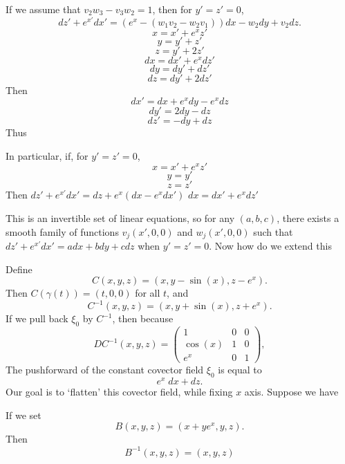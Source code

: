 \documentclass[dvipsnames,letterpaper,12pt]{article}
\begin{document}
%
If we assume that $v_2 w_3 - v_3 w_2 = 1$, then for $y' = z' = 0$,
%
\[ dz' + e^{x'} dx' = (e^x - (w_1 v_2 - w_2 v_1)) dx  - w_2 dy + v_2 dz. \]
%
\[ x = x' + e^x z' \]
\[ y = y' + z' \]
\[ z = y' + 2 z' \]
%
\[ dx = dx' + e^x dz' \]
\[ dy = dy' + dz' \]
\[ dz = dy' + 2dz' \]
%
Then
%
\[ dx' = dx + e^x dy - e^x dz \]
\[ dy' = 2 dy - dz \]
\[ dz' = - dy + dz \]
%
Thus

%
%

In particular, if, for $y' = z' = 0$,
%
\[ x = x' + e^x z' \]
\[ y = y' \]
\[ z = z' \]
%
Then $dz' + e^{x'} dx' = dz + e^x (dx - e^x dx')$   $dx = dx' + e^x dz'$




This is an invertible set of linear equations, so for any $(a,b,c)$, there exists a smooth family of functions $v_j(x',0,0)$ and $w_j(x',0,0)$ such that $dz' + e^{x'} dx' = a dx + bdy + cdz$ when $y' = z' = 0$. Now how do we extend this


Define
%
\[ C(x,y,z) = (x,   y-\sin(x)   , z - e^x). \]
%
Then $C(\gamma(t)) = (t,0,0)$ for all $t$, and
%
\[ C^{-1}(x,y,z) = ( x, y + \sin(x), z + e^x ). \]
%
If we pull back $\xi_0$ by $C^{-1}$, then because
%
\[ DC^{-1}(x,y,z) = \begin{pmatrix} 1 & 0 & 0 \\ \cos(x) & 1 & 0 \\ e^x & 0 & 1 \end{pmatrix}, \]
%
The pushforward of the constant covector field $\xi_0$ is equal to
%
\[ e^x\; dx + dz. \]
%
Our goal is to `flatten' this covector field, while fixing $x$ axis. Suppose we have
%




If we set 
%
\[ B(x,y,z) = ( x + y e^x , y, z ). \]
%
Then
%
\[ B^{-1}(x,y,z) = ( x , y, z ) \]
\end{document}
